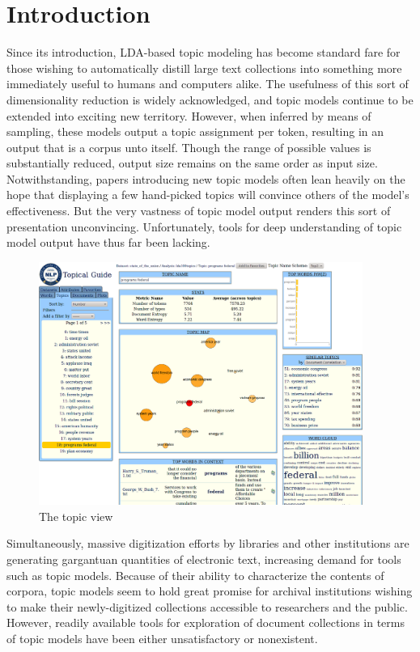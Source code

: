 \documentclass[11pt]{article}
\begin{document}
\section{Introduction}
Since its introduction, LDA-based topic modeling \cite{blei_latent_2003} has
become standard fare for those wishing to automatically distill large text
collections into something more immediately useful to humans and computers
alike. The usefulness of this sort of dimensionality reduction is widely
acknowledged, and topic models continue to be extended into exciting new
territory.
\cite{wang_continuous_2008,mimno_polylingual_2009,boyd-graber_holistic_2010,brody_unsupervised_2010,he_detecting_2009,yao_efficient_2009}
However, when inferred by means of sampling, these models output a topic
assignment per token, resulting in an output that is a corpus unto itself.
Though the range of possible values is substantially reduced, output size
remains on the same order as input size. Notwithstanding, papers introducing new
topic models often lean heavily on the hope that displaying a few hand-picked
topics will convince others of the model's effectiveness. But the very vastness
of topic model output renders this sort of presentation unconvincing.
Unfortunately, tools for deep understanding of topic model output have thus far
been lacking.
\begin{figure}[t]
 \centering
 \includegraphics[width=400px,keepaspectratio=true]{./topic_page_take4.png}
 \caption{The topic view}
 \label{fig:topic_page}
\end{figure}
Simultaneously, massive digitization efforts by libraries and other institutions
are generating gargantuan quantities of electronic text, increasing demand for tools such as
topic models. Because of their ability to characterize the contents of
corpora, topic models seem to hold great promise for archival
institutions wishing to make their newly-digitized collections accessible to
researchers and the public. However, readily available tools for exploration of 
document collections in terms of topic models have been either unsatisfactory
or nonexistent.
\end{document}
